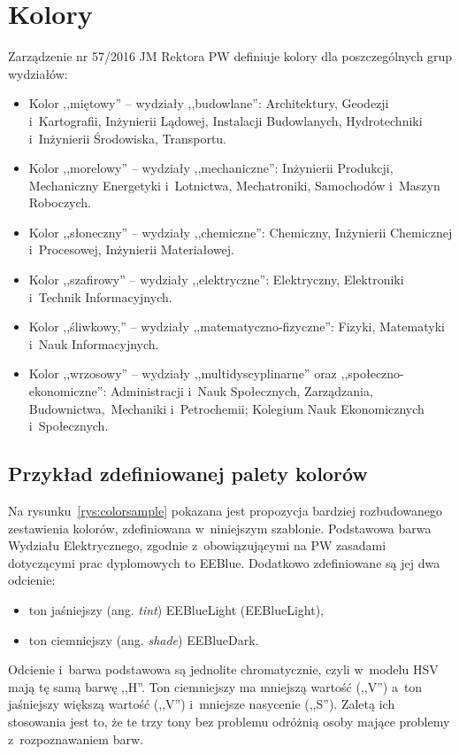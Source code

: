 \section{Kolory}
Zarządzenie nr 57/2016 JM Rektora PW definiuje kolory dla poszczególnych grup wydziałów:
\begin{itemize}
 \item Kolor ,,miętowy'' -- \colorbox{bud}{wydziały ,,budowlane'':}{\color{bud} Architektury, Geodezji i~Kartografii, Inżynierii Lądowej, Instalacji Budowlanych, Hydrotechniki i~Inżynierii Środowiska, Transportu.}
 \item Kolor ,,morelowy'' -- \colorbox{mech}{wydziały ,,mechaniczne'':}{\color{mech} Inżynierii Produkcji, Mechaniczny Energetyki i~Lotnictwa, Mechatroniki, Samochodów i~Maszyn Roboczych.}
 \item Kolor ,,słoneczny'' -- \colorbox{chem}{wydziały ,,chemiczne'':}{\color{chem} Chemiczny, Inżynierii Chemicznej i~Procesowej, Inżynierii Materiałowej.}
 \item Kolor ,,szafirowy'' -- \colorbox{elek}{wydziały ,,elektryczne'':}{\color{elek} Elektryczny, Elektroniki i~Technik Informacyjnych.}
 \item Kolor ,,śliwkowy,'' -- \colorbox{mfiz}{wydziały ,,matematyczno-fizyczne'':}{\color{mfiz} Fizyki, Matematyki i~Nauk Informacyjnych.}
 \item Kolor ,,wrzosowy'' -- \colorbox{multi}{wydziały ,,multidyscyplinarne'' oraz ,,społeczno-ekonomiczne'':}{\color{multi} Administracji i~Nauk Społecznych, Zarządzania, Budownictwa,~Mechaniki i~Petrochemii; Kolegium Nauk Ekonomicznych i~Społecznych.}
\end{itemize}

\subsection{Przykład zdefiniowanej palety kolorów}
Na rysunku~\ref{rys:colorsample} pokazana jest propozycja bardziej rozbudowanego zestawienia kolorów, zdefiniowana w~niniejszym szablonie. Podstawowa barwa Wydziału Elektrycznego, zgodnie z~obowiązującymi na PW zasadami dotyczącymi prac dyplomowych to \textcolor{EEBlue}{EEBlue}. Dodatkowo zdefiniowane są jej dwa odcienie:
\begin{itemize}
    \item ton jaśniejszy (ang. \textit{tint}) \textcolor{EEBlueLight}{EEBlueLight} (EEBlueLight),
    \item ton ciemniejszy (ang. \textit{shade}) \textcolor{EEBlueDark}{EEBlueDark}.
\end{itemize}
Odcienie i~barwa podstawowa są jednolite chromatycznie, czyli w~modelu HSV mają tę samą barwę ,,H''. Ton ciemniejszy ma mniejszą wartość (,,V'') a~ton jaśniejszy większą wartość (,,V'') i~mniejsze nasycenie (,,S''). Zaletą ich stosowania jest to, że te trzy tony bez problemu odróżnią osoby mające problemy z~rozpoznawaniem barw. 

